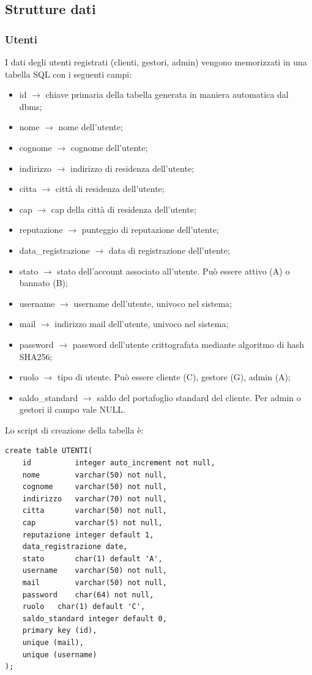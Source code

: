 \documentclass[a4paper, 14pt]{article}
\begin{document}
\begin{flushleft}
		
		\subsection{Strutture dati}
				\subsubsection{Utenti}
				I dati degli utenti registrati (clienti, gestori, admin) vengono memorizzati in una tabella SQL con i seguenti campi:
				\begin{itemize}
					\item id $\rightarrow$ chiave primaria della tabella generata in maniera automatica dal dbms;
					\item nome $\rightarrow$ nome dell'utente;
					\item cognome $\rightarrow$ cognome dell'utente;
					\item indirizzo $\rightarrow$ indirizzo di residenza dell'utente; 
					\item citta $\rightarrow$ città di residenza dell'utente;
					\item cap $\rightarrow$ cap della città di residenza dell'utente;
					\item reputazione $\rightarrow$ punteggio di reputazione dell'utente;
					\item data\_registrazione $\rightarrow$ data di registrazione dell'utente;
					\item stato $\rightarrow$ stato dell'account associato all'utente. Può essere attivo (A) o bannato (B);
					\item username $\rightarrow$ username dell'utente, univoco nel sistema;
					\item mail $\rightarrow$ indirizzo mail dell'utente, univoco nel sistema;
					\item password $\rightarrow$ password dell'utente crittografata mediante algoritmo di hash SHA256;
					\item ruolo $\rightarrow$ tipo di utente. Può essere cliente (C), gestore (G), admin (A);
					\item saldo\_standard $\rightarrow$ saldo del portafoglio standard del cliente. Per admin o gestori il campo vale NULL.
				\end{itemize}
				Lo script di creazione della tabella è: \\
				\begin{lstlisting}
create table UTENTI(
	id          integer auto_increment not null,
	nome        varchar(50) not null,
	cognome     varchar(50) not null,
	indirizzo   varchar(70) not null,
	citta       varchar(50) not null,
	cap         varchar(5) not null,
	reputazione integer default 1,
	data_registrazione date,
	stato       char(1) default 'A',
	username    varchar(50) not null,
	mail        varchar(50) not null,
	password    char(64) not null,
	ruolo   char(1) default 'C',
	saldo_standard integer default 0,
	primary key (id),
	unique (mail),
	unique (username)
);
				\end{lstlisting}


\end{flushleft}
\end{document}
